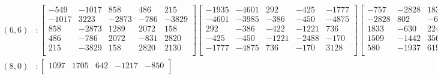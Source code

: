 \documentclass[12pt]{amsart}
\theoremstyle{plain}
\theoremstyle{definition}
\begin{document}
\begin{landscape}
\thispagestyle{empty}
\tiny
\begin{align*} 
(6,6) &:
\begin{bmatrix}
-549  &   -1017  &   858  &   486  &   215  \\ 
 -1017  &   3223  &   -2873  &   -786  &   -3829  \\ 
 858  &   -2873  &   1289  &   2072  &   158  \\ 
 486  &   -786  &   2072  &   -831  &   2820  \\ 
 215  &   -3829  &   158  &   2820  &   2130  \\ 
\end{bmatrix}
\begin{bmatrix}
-1935  &   -4601  &   292  &   -425  &   -1777  \\ 
 -4601  &   -3985  &   -386  &   -450  &   -4875  \\ 
 292  &   -386  &   -422  &   -1221  &   736  \\ 
 -425  &   -450  &   -1221  &   -2488  &   -170  \\ 
 -1777  &   -4875  &   736  &   -170  &   3128  \\ 
\end{bmatrix}
\begin{bmatrix}
-757  &   -2828  &   1833  &   1509  &   580  \\ 
 -2828  &   802  &   -630  &   -1442  &   -1937  \\ 
 1833  &   -630  &   224  &   356  &   619  \\ 
 1509  &   -1442  &   356  &   162  &   336  \\ 
 580  &   -1937  &   619  &   336  &   4057  \\ 
\end{bmatrix}
\begin{bmatrix}
-542  &   1158  &   -478  &   -733  &   98  \\ 
 1158  &   -4276  &   2006  &   2124  &   2614  \\ 
 -478  &   2006  &   -2123  &   -824  &   -1417  \\ 
 -733  &   2124  &   -824  &   -1178  &   -746  \\ 
 98  &   2614  &   -1417  &   -746  &   -4443  \\ 
\end{bmatrix}
\\
(8,0) &:
\begin{bmatrix}
1097  &   1705  &   642  &   -1217  &   -850  \\ 

\end{bmatrix}
\end{align*}
\end{landscape}
\end{document}
